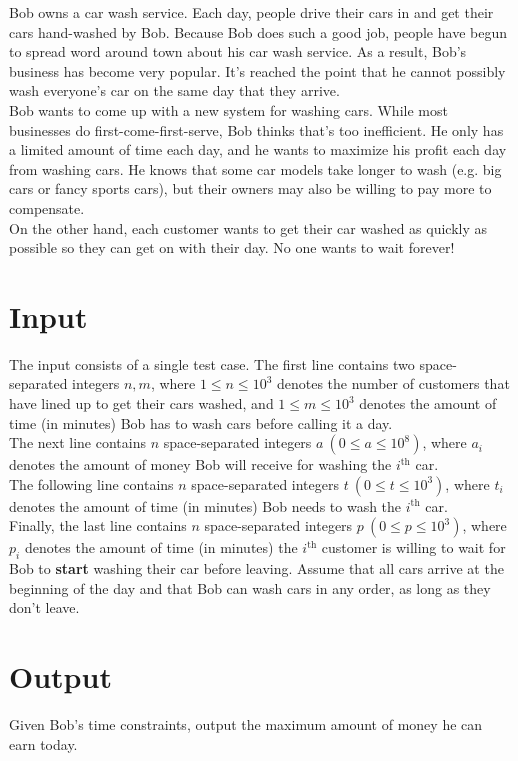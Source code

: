 
\noindent Bob owns a car wash service. Each day, people drive their cars in and get their cars hand-washed by Bob. Because Bob does such a good job, people have begun to spread word around town about his car wash service. As a result, Bob's business has become very popular. It's reached the point that he cannot possibly wash everyone's car on the same day that they arrive. \\

\noindent Bob wants to come up with a new system for washing cars. While most businesses do first-come-first-serve, Bob thinks that's too inefficient. He only has a limited amount of time each day, and he wants to maximize his profit each day from washing cars. He knows that some car models take longer to wash (e.g. big cars or fancy sports cars), but their owners may also be willing to pay more to compensate. \\

\noindent On the other hand, each customer wants to get their car washed as quickly as possible so they can get on with their day. No one wants to wait forever!

\section*{Input}

\noindent The input consists of a single test case. The first line contains two space-separated integers $n, m$, where $1 \leq n \leq 10^3$ denotes the number of customers that have lined up to get their cars washed, and $1 \leq m \leq 10^3$ denotes the amount of time (in minutes) Bob has to wash cars before calling it a day. \\

\noindent The next line contains $n$ space-separated integers $a\ (0 \leq a \leq 10^8)$, where $a_i$ denotes the amount of money Bob will receive for washing the $i^\text{th}$ car. \\

\noindent The following line contains $n$ space-separated integers $t\ (0 \leq t \leq 10^3)$, where $t_i$ denotes the amount of time (in minutes) Bob needs to wash the $i^\text{th}$ car. \\

\noindent Finally, the last line contains $n$ space-separated integers $p\ (0 \leq p \leq 10^3)$, where $p_i$ denotes the amount of time (in minutes) the $i^\text{th}$ customer is willing to wait for Bob to \textbf{start} washing their car before leaving. Assume that all cars arrive at the beginning of the day and that Bob can wash cars in any order, as long as they don't leave.

\section*{Output}

Given Bob's time constraints, output the maximum amount of money he can earn today. 
